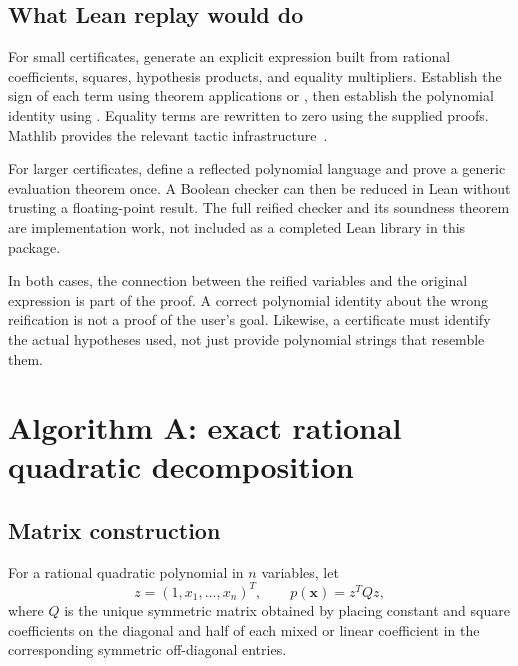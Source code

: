 \subsection{What Lean replay would do}

For small certificates, generate an explicit expression built from rational coefficients, squares, hypothesis products, and equality multipliers. Establish the sign of each term using theorem applications or , then establish the polynomial identity using . Equality terms are rewritten to zero using the supplied proofs. Mathlib provides the relevant tactic infrastructure~\cite{positivity,ring}.

For larger certificates, define a reflected polynomial language and prove a generic evaluation theorem once. A Boolean checker can then be reduced in Lean without trusting a floating-point result. The full reified checker and its soundness theorem are implementation work, not included as a completed Lean library in this package.

In both cases, the connection between the reified variables and the original expression is part of the proof. A correct polynomial identity about the wrong reification is not a proof of the user's goal. Likewise, a certificate must identify the actual hypotheses used, not just provide polynomial strings that resemble them.

\section{Algorithm A: exact rational quadratic decomposition}

\subsection{Matrix construction}

For a rational quadratic polynomial in $n$ variables, let
\[
 z=(1,x_1,\ldots,x_n)^T,\qquad p(\bm x)=z^TQz,
\]
where $Q$ is the unique symmetric matrix obtained by placing constant and square coefficients on the diagonal and half of each mixed or linear coefficient in the corresponding symmetric off-diagonal entries.

